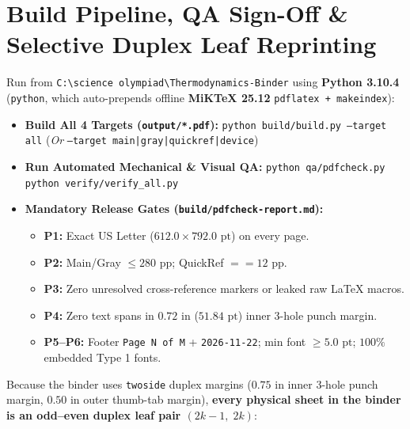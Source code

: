 \section{Build Pipeline, QA Sign-Off \& Selective Duplex Leaf Reprinting}\label{app:H.2}

\begin{twocol}[0.49]
\begin{formulacard}
Run from \texttt{C:\textbackslash science olympiad\textbackslash Thermodynamics-Binder} using \textbf{Python 3.10.4} (\texttt{python}, which auto-prepends offline \textbf{MiKTeX 25.12} \texttt{pdflatex + makeindex}):
\begin{itemize}
  \item \textbf{Build All 4 Targets (\texttt{output/*.pdf}):}\newline
    \texttt{python build/build.py --target all}\newline
    (\emph{Or} \texttt{--target main|gray|quickref|device})
  \item \textbf{Run Automated Mechanical \& Visual QA:}\newline
    \texttt{python qa/pdfcheck.py}\newline
    \texttt{python verify/verify\_all.py}
  \item \textbf{Mandatory Release Gates (\texttt{build/pdfcheck-report.md}):}
    \begin{itemize}
      \item \textbf{P1:} Exact US Letter ($612.0 \times 792.0\text{ pt}$) on every page.
      \item \textbf{P2:} Main/Gray $\le 280\text{ pp}$; QuickRef $== 12\text{ pp}$.
      \item \textbf{P3:} Zero unresolved cross-reference markers or leaked raw LaTeX macros.
      \item \textbf{P4:} Zero text spans in $0.72\text{ in}$ ($51.84\text{ pt}$) inner 3-hole punch margin.
      \item \textbf{P5--P6:} Footer \texttt{Page N of M} + \texttt{2026-11-22}; min font $\ge 5.0\text{ pt}$; $100\%$ embedded Type 1 fonts.
    \end{itemize}
\end{itemize}
\end{formulacard}
\nextcol[0.49]
\begin{formulacard}
Because the binder uses \texttt{twoside} duplex margins ($0.75\text{ in}$ inner 3-hole punch margin, $0.50\text{ in}$ outer thumb-tab margin), \textbf{every physical sheet in the binder is an odd--even duplex leaf pair $(2k-1,\; 2k)$}:

\end{formulacard}
\end{twocol}
